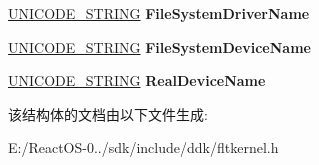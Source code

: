 \begin{DoxyCompactItemize}
\hyperlink{struct___u_n_i_c_o_d_e___s_t_r_i_n_g}{U\+N\+I\+C\+O\+D\+E\+\_\+\+S\+T\+R\+I\+NG} {\bfseries File\+System\+Driver\+Name}
\item 
\mbox{\label{struct___f_l_t___v_o_l_u_m_e___p_r_o_p_e_r_t_i_e_s_a9803a42d047e9a1905500099e3b73c3b}} 
\hyperlink{struct___u_n_i_c_o_d_e___s_t_r_i_n_g}{U\+N\+I\+C\+O\+D\+E\+\_\+\+S\+T\+R\+I\+NG} {\bfseries File\+System\+Device\+Name}
\item 
\mbox{\label{struct___f_l_t___v_o_l_u_m_e___p_r_o_p_e_r_t_i_e_s_ab97d3e6f602e3aff09e4ef46e4dd3b30}} 
\hyperlink{struct___u_n_i_c_o_d_e___s_t_r_i_n_g}{U\+N\+I\+C\+O\+D\+E\+\_\+\+S\+T\+R\+I\+NG} {\bfseries Real\+Device\+Name}
\end{DoxyCompactItemize}


该结构体的文档由以下文件生成\+:\begin{DoxyCompactItemize}
\item 
E\+:/\+React\+O\+S-\/0../sdk/include/ddk/fltkernel.\+h\end{DoxyCompactItemize}
